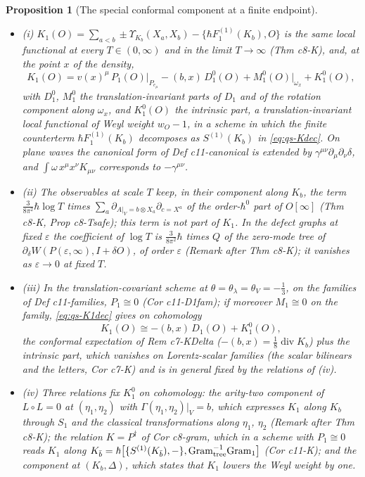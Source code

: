 \documentclass[11pt]{article}
\numberwithin{equation}{section}
\theoremstyle{plain}
\newtheorem{proposition}[theorem]{Proposition}
\theoremstyle{definition}
\begin{document}
\begin{proposition}[The special conformal component at a finite endpoint]
\label{prop:qs-K}
\begin{itemize}
\item (i) $K_1(O)=\sum_{a<b}\pm\Upsilon_{K_b}(X_a,X_b)-\{\hbar F_1^{(1)}(K_b),O\}$ is the same local functional at every $T\in(0,\infty)$ and in the limit $T\to\infty$ (Thm c8-K), and, at the point $x$ of the density,
\begin{equation}
K_1(O)=v(x)^\mu\,P_1(O)\big|_{P_{e_\mu}}-(b,x)\,D^0_1(O)+M^0_1(O)\big|_{\omega_x}+K^0_1(O),
\label{eq:qs-K1dec}
\end{equation}
with $D^0_1$, $M^0_1$ the translation-invariant parts of $D_1$ and of the rotation component along $\omega_x$, and $K^0_1(O)$ the intrinsic part, a translation-invariant local functional of Weyl weight $w_O-1$, in a scheme in which the finite counterterm $\hbar F_1^{(1)}(K_b)$ decomposes as $S^{(1)}(K_b)$ in \eqref{eq:qs-Kdec}. On plane waves the canonical form of Def c11-canonical is extended by $\gamma^{\mu\nu}\partial_\mu\partial_\nu\delta$, and $\int\omega\,x^\mu x^\nu K_{\mu\nu}$ corresponds to $-\gamma^{\mu\nu}$.
\item (ii) The observables at scale $T$ keep, in their component along $K_b$, the term $\tfrac3{8\pi^2}\hbar\log T$ times $\sum_a\partial_{A|_V=b\otimes X_a}\partial_{c=X^a}$ of the order-$\hbar^0$ part of $O[\infty]$ (Thm c8-K, Prop c8-Tsafe); this term is not part of $K_1$. In the defect graphs at fixed $\varepsilon$ the coefficient of $\log T$ is $\tfrac3{8\pi^2}\hbar$ times $Q$ of the zero-mode tree of $\partial_\delta W(P(\varepsilon,\infty),I+\delta O)$, of order $\varepsilon$ (Remark after Thm c8-K); it vanishes as $\varepsilon\to0$ at fixed $T$.
\item (iii) In the translation-covariant scheme at $\theta=\theta_\lambda=\theta_V=-\tfrac13$, on the families of Def c11-families, $P_1\cong0$ (Cor c11-D1fam); if moreover $M_1\cong0$ on the family, \eqref{eq:qs-K1dec} gives on cohomology
\[
K_1(O)\cong-(b,x)\,D_1(O)+K^0_1(O),
\]
the conformal expectation of Rem c7-KDelta ($-(b,x)=\tfrac18\operatorname{div}K_b$) plus the intrinsic part, which vanishes on Lorentz-scalar families (the scalar bilinears and the letters, Cor c7-K) and is in general fixed by the relations of (iv).
\item (iv) Three relations fix $K^0_1$ on cohomology: the arity-two component of $L\circ L=0$ at $(\eta_1,\eta_2)$ with $\Gamma(\eta_1,\eta_2)|_V=b$, which expresses $K_1$ along $K_b$ through $S_1$ and the classical transformations along $\eta_1$, $\eta_2$ (Remark after Thm c8-K); the relation $K=P^\dagger$ of Cor c8-gram, which in a scheme with $P_1\cong0$ reads $K_1$ along $K_{\bar b}=\hbar\big[\{S^{(1)}(K_{\bar b}),-\},\mathrm{Gram}_{\rm tree}^{-1}\mathrm{Gram}_1\big]$ (Cor c11-K); and the component at $(K_b,\Delta)$, which states that $K_1$ lowers the Weyl weight by one.
\end{itemize}
\end{proposition}
\end{document}
